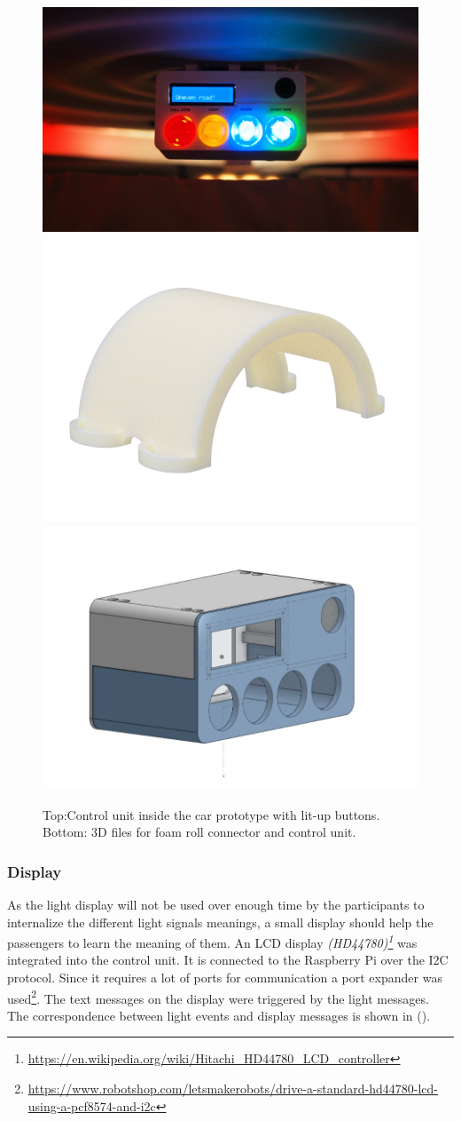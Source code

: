 \begin{figure}
\includegraphics[width=\textwidth]{fig/monitor2.JPG}\hfill\includegraphics[height=0.36\textwidth]{fig/KabelH.png}\hfill\includegraphics[height=0.36\textwidth]{fig/controlBox2.JPG}
\caption[Control Unit]{Top:Control unit inside the car prototype with lit-up buttons. Bottom: 3D files for foam roll connector and control unit.}
\label{fig:boxes}
\end{figure}

\subsubsection{Display}
\label{ssec:display}
As the light display will not be used over enough time by the participants to internalize the different light signals meanings, a small display should help the passengers to learn the meaning of them. An LCD display \emph{(HD44780)\footnote{\url{https://en.wikipedia.org/wiki/Hitachi_HD44780_LCD_controller}}} was integrated into the control unit. It is connected to the Raspberry Pi over the I2C protocol. Since it requires a lot of ports for communication 
a port expander was used\footnote{\url{https://www.robotshop.com/letsmakerobots/drive-a-standard-hd44780-lcd-using-a-pcf8574-and-i2c}}. The text messages on the display were triggered by the light messages. The correspondence between light events and display messages is shown in (\emph{}).

